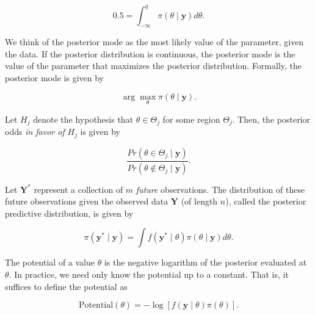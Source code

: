 \documentclass[
  letterpaper,
  DIV=11,
  numbers=noendperiod]{scrreprt}
\providecommand{\tightlist}{%
  \setlength{\itemsep}{0pt}\setlength{\parskip}{0pt}}\usepackage{longtable,booktabs,array}
\theoremstyle{definition}
\theoremstyle{definition}
\theoremstyle{plain}
\theoremstyle{remark}
\begin{document}
\[0.5 = \int_{-\infty}^{q} \pi(\theta \mid \mathbf{y}) d\theta.\]

\begin{description}
\tightlist
\item[Posterior Mode (Definition~\ref{def-posterior-mode})]
We think of the posterior mode as the most likely value of the
parameter, given the data. If the posterior distribution is continuous,
the posterior mode is the value of the parameter that maximizes the
posterior distribution. Formally, the posterior mode is given by
\end{description}

\[\arg \max_{\theta} \pi(\theta \mid \mathbf{y}).\]

\begin{description}
\tightlist
\item[Posterior Odds (Definition~\ref{def-posterior-odds})]
Let \(H_j\) denote the hypothesis that \(\theta \in \Theta_j\) for some
region \(\Theta_j\). Then, the posterior odds \emph{in favor of} \(H_j\)
is given by
\end{description}

\[\frac{Pr\left(\theta \in \Theta_j \mid \mathbf{y}\right)}{Pr\left(\theta \notin \Theta_j \mid \mathbf{y}\right)}.\]

\begin{description}
\tightlist
\item[Posterior Predictive Distribution
(Definition~\ref{def-posterior-predictive-distribution})]
Let \(\mathbf{Y}^*\) represent a collection of \(m\) \emph{future}
observations. The distribution of these future observations given the
observed data \(\mathbf{Y}\) (of length \(n\)), called the posterior
predictive distribution, is given by
\end{description}

\[\pi\left(\mathbf{y}^* \mid \mathbf{y}\right) = \int f\left(\mathbf{y}^* \mid \theta\right) \pi(\theta \mid \mathbf{y}) d\theta.\]

\begin{description}
\tightlist
\item[Potential (Definition~\ref{def-potential})]
The potential of a value \(\theta\) is the negative logarithm of the
posterior evaluated at \(\theta\). In practice, we need only know the
potential up to a constant. That is, it suffices to define the potential
as
\end{description}

\[\text{Potential}(\theta) = -\log\left[f(\mathbf{y} \mid \theta) \pi(\theta)\right].\]
\end{document}
